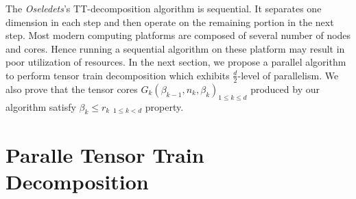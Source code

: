 \documentclass[runningheads]{llncs}
\begin{document}
The \textit{Oseledets}'s TT-decomposition algorithm is sequential. It separates one dimension in each step and then operate on the remaining portion in the next step. Most modern computing platforms are composed of several number of nodes and cores. Hence running a sequential algorithm on these platform may result in poor utilization of resources. In the next section, we propose a parallel algorithm to perform tensor train decomposition which exhibits $\frac{d}{2}$-level of parallelism. We also prove that the tensor cores $G_k(\beta_{k-1}, n_k, \beta_k) _{1\le k\le d}$ produced by our algorithm satisfy $\beta_k \le r_k$ $_{1\le k < d}$ property.
  

\section{Paralle Tensor Train Decomposition}
\label{sec:tt_parallel}
\end{document}
